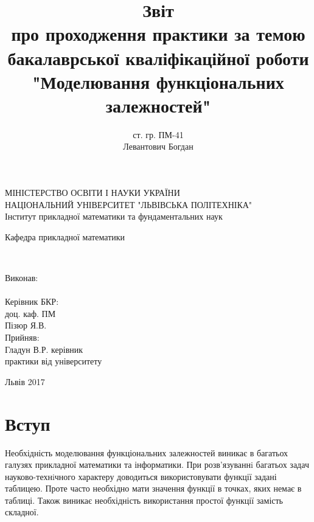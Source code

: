 \documentclass[ukrainian,14pt]{extarticle}
\begin{document}
\title{
	Звіт \\
	про проходження практики за темою \\
	бакалаврської кваліфікаційної роботи\\
    "Моделювання функціональних залежностей"
}
\author{ст. гр. ПМ-41 \\  Левантович Богдан}

\makeatletter
\begin{titlepage}
        \centering
	МІНІСТЕРСТВО ОСВІТИ І НАУКИ УКРАЇНИ \\
	НАЦІОНАЛЬНИЙ УНІВЕРСИТЕТ "ЛЬВІВСЬКА ПОЛІТЕХНІКА" \\
	Інститут прикладної математики та фундаментальних наук\\
	\vspace{20pt}
	
	\begin{flushright}
	Кафедра прикладної математики
	\end{flushright}

	\centering
	\vspace{\fill}

	\@title \\
	\vspace{120pt}
	\raggedright
        \setlength{\leftskip}{11cm}
	Виконав:\\
	\@author\\
        Керівник БКР:\\
        доц. каф. ПМ \\
        Пізюр Я.В.\\
	Прийняв: \\
	Гладун В.Р. керівник \\
	практики від університету\\
        \setlength{\leftskip}{0cm}
	\vspace{110pt}
	\centering


	Львів 2017
\end{titlepage}
\makeatother

\setcounter{page}{2}
\tableofcontents

\newpage


\section*{Вступ}


Необхідність моделювання функціональних залежностей виникає в багатьох галузях прикладної математики та інформатики. При розв’язуваннi багатьох задач науково-технiчного характеру доводиться використовувати функції задані таблицею. Проте часто необхідно мати значення функції в точках, яких немає в таблиці. Також виникає необхідність використання простої функції замість складної. 
\end{document}
